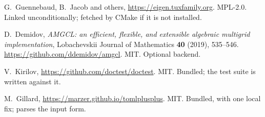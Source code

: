 \begin{description}[leftmargin=0pt, labelsep=0.5em, style=unboxed]
  \item[Eigen.] G.~Guennebaud, B.~Jacob and others,
    \url{https://eigen.tuxfamily.org}. MPL-2.0. Linked unconditionally; fetched by CMake if it is not installed.

  \item[AMGCL.] D.~Demidov, \emph{AMGCL: an efficient, flexible, and extensible
    algebraic multigrid implementation}, Lobachevskii Journal of Mathematics
    \textbf{40} (2019), 535--546. \url{https://github.com/ddemidov/amgcl}.
    MIT. Optional backend.

  \item[doctest.] V.~Kirilov, \url{https://github.com/doctest/doctest}. MIT.
    Bundled; the test suite is written against it.

  \item[toml++.] M.~Gillard, \url{https://marzer.github.io/tomlplusplus}. MIT.
    Bundled, with one local fix; parses the  input form.
\end{description}
